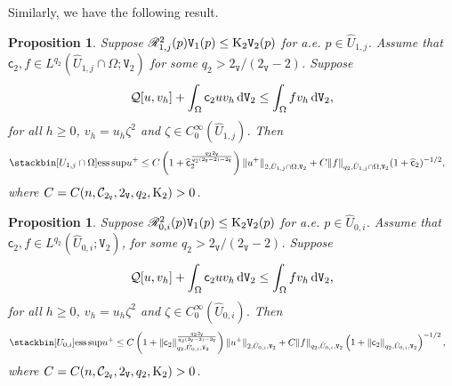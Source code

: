 \documentclass[reqno, 11pt, a4paper]{amsart}
\newtheorem{proposition}[theorem]{Proposition}
\numberwithin{equation}{section}
\newcommand{\ops}{\mathcal{Q}}
\newcommand{\xv}{2_{\mathtt{V}}}
\newcommand{\ck}{\textnormal K}
\newcommand{\fc}{\mathsf c}
\newcommand{\wghtv}{\mathtt{V}}
\newcommand{\dwv}{\textnormal{d} \mathtt{V}}
\newcommand{\kp}{\mathscr{R}}
\newcommand{\pvr}{p}
\newcommand{\qxp}{q}
\begin{document}
Similarly, we have the following result.
\begin{proposition} \label{86}
Suppose $\kp _{1 , j} ^{2 } (\pvr) \wghtv _1 (\pvr )  \leq \ck _{2} \wghtv _2 (\pvr )$ for   a.e. $\pvr  \in \hat U _{1,j}$.    Assume that   $\fc _2, f \in L^{q_2} (\hat U _{1,j} \cap \Omega  ; \wghtv _2)$  for some  $q _2 >  \xv / (\xv -2)  $. Suppose  
\begin{equation*}
\begin{aligned}
 \ops [u,v_{h} ] + \int  _{\Omega } \fc _2 u v_{h}   \,  \dwv _{2}   
 \leq \int  _{\Omega }    f v_{ h } \, \dwv _{2}  ,  
\end{aligned}
\end{equation*}
for all $h\geq 0 $,   $v _{ h }  = u_{ h }  \zeta ^2 $ and $\zeta \in C^{\infty} _0 ( \hat U_{1,j} )$. Then
\begin{align*}
& \stackbin[ U _{1,j} \cap \Omega ]{}{\operatorname{ess}\sup}    u^{+}   \leq  C\left( 1 +  \widehat{\fc}_2 ^{\frac{\qxp _2 \xv }{\qxp _2 (\xv -2) - \xv}}      \right)\Vert u^+ \Vert _{2 , \hat U _{1,j} \cap \Omega   , \wghtv _2}  +  C  \Vert f \Vert _{ q_2 ,  \hat U _{1,j}  \cap \Omega , \wghtv _2}  (1+\widehat{\fc}_2 )^{-1/2} ,
\end{align*}
where  $C=C (  n , \mathcal C_{\xv} , \xv , \qxp _2 , \ck _2  ) >0$.
\end{proposition}




\begin{proposition} \label{53}
 Suppose $\kp _{0 , i} ^{2 } (\pvr) \wghtv _1 (\pvr )  \leq \ck _{2} \wghtv _2 (\pvr )$ for   a.e. $\pvr  \in \hat U _{0,i}$.    Assume that   $\fc _2, f \in L^{q_2} ( \hat U_{0,i}    ; \wghtv _2)$,   for some  $q _2 >  \xv / (\xv -2) $. Suppose  
\begin{equation*}
\begin{aligned}
 \ops [u,v_{h} ] + \int  _{\Omega } \fc _2 u v_{h}  \,  \dwv _{2}    
 \leq \int  _{\Omega}    f v_{ h } \, \dwv _{2}  ,
\end{aligned}
\end{equation*}
for all $h\geq 0 $,   $v _{ h }  = u_{ h }  \zeta ^2 $ and $\zeta \in C^{\infty} _0 ( \hat U_{0,i} )$. Then
\begin{align*}
 &\stackbin[ U_{0,i}]{}{\operatorname{ess}\sup}  u^{+} 
   \leq  C \left( 1+ \|\fc _2 \|_{\qxp _2 , \hat U_{0,i} , \wghtv _2} ^{\frac{\qxp _2 \xv }{\qxp _2 (\xv -2) - \xv}} \right) \Vert u^+ \Vert _{2 , \hat U _{0,i} , \wghtv _2}  +  C  \Vert f \Vert _{ q_2 ,  \hat U _{0,i} , \wghtv _2}   \left(1+\|\fc _2 \|_{\qxp _2 , \hat U_{0,i} , \wghtv _2}  \right)^{-1/2},
\end{align*}
where  $C=C (  n , \mathcal C_{\xv} ,    \xv ,  \qxp _2  , \ck _2)  >0$.
\end{proposition}
 
\end{document}
